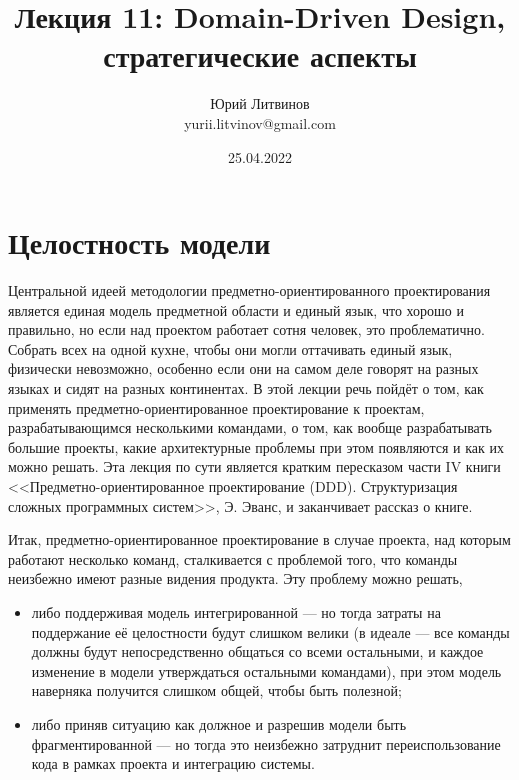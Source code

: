 \documentclass[a5paper]{article}
\title{Лекция 11: Domain-Driven Design, стратегические аспекты}
\author{Юрий Литвинов\\\small{yurii.litvinov@gmail.com}}
\date{25.04.2022}
\begin{document}
\maketitle
\thispagestyle{empty}

\section{Целостность модели}

Центральной идеей методологии предметно-ориентированного проектирования является единая модель предметной области и единый язык, что хорошо и правильно, но если над проектом работает сотня человек, это проблематично. Собрать всех на одной кухне, чтобы они могли оттачивать единый язык, физически невозможно, особенно если они на самом деле говорят на разных языках и сидят на разных континентах. В этой лекции речь пойдёт о том, как применять предметно-ориентированное проектирование к проектам, разрабатывающимся несколькими командами, о том, как вообще разрабатывать большие проекты, какие архитектурные проблемы при этом появляются и как их можно решать. Эта лекция по сути является кратким пересказом части IV книги <<Предметно-ориентированное проектирование (DDD). Структуризация сложных программных систем>>, Э. Эванс, и заканчивает рассказ о книге.

Итак, предметно-ориентированное проектирование в случае проекта, над которым работают несколько команд, сталкивается с проблемой того, что команды неизбежно имеют разные видения продукта. Эту проблему можно решать, 

\begin{itemize}
    \item либо поддерживая модель интегрированной --- но тогда затраты на поддержание её целостности будут слишком велики (в идеале --- все команды должны будут непосредственно общаться со всеми остальными, и каждое изменение в модели утверждаться остальными командами), при этом модель наверняка получится слишком общей, чтобы быть полезной;
    \item либо приняв ситуацию как должное и разрешив модели быть фрагментированной --- но тогда это неизбежно затруднит переиспользование кода в рамках проекта и интеграцию системы.
\end{itemize}
\end{document}
